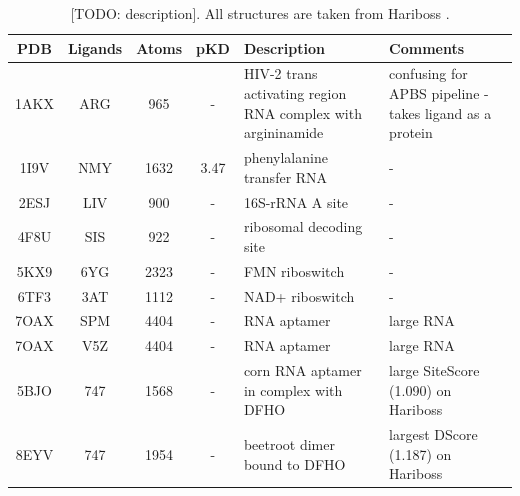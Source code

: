   \begin{table}[H]
    \caption{\label{tab:methods/benchmark_rna} [TODO: description]. All structures are taken from Hariboss \cite{hariboss_2022}.}
    \centering
    \begin{tabular}{ccccp{1.5in}p{1.5in}}
      \hline
      PDB  & Ligands & Atoms & pKD  & Description                                                 & Comments                                                \\ \hline
      1AKX & ARG     & 965   & -    & HIV-2 trans activating region RNA complex with argininamide & confusing for APBS pipeline - takes ligand as a protein \\ \hline
      1I9V & NMY     & 1632  & 3.47 & phenylalanine transfer RNA                                  & -                                                       \\ \hline
      2ESJ & LIV     & 900   & -    & 16S-rRNA A site                                             & -                                                       \\ \hline
      4F8U & SIS     & 922   & -    & ribosomal decoding site                                     & -                                                       \\ \hline
      5KX9 & 6YG     & 2323  & -    & FMN riboswitch                                              & -                                                       \\ \hline
      6TF3 & 3AT     & 1112  & -    & NAD+ riboswitch                                             & -                                                       \\ \hline
      7OAX & SPM     & 4404  & -    & RNA aptamer                                                 & large RNA                                               \\ \hline
      7OAX & V5Z     & 4404  & -    & RNA aptamer                                                 & large RNA                                               \\ \hline
      5BJO & 747     & 1568  & -    & corn RNA aptamer in complex with DFHO                       & large SiteScore (1.090) on Hariboss                     \\ \hline
      8EYV & 747     & 1954  & -    & beetroot dimer bound to DFHO                                & largest DScore (1.187) on Hariboss                      \\ \hline
    \end{tabular}
  \end{table}


